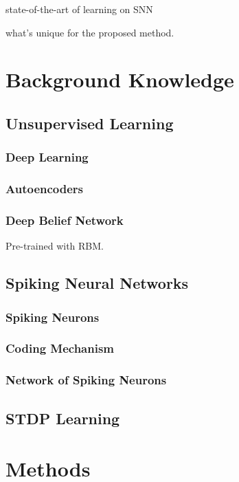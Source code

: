 \documentclass{article}
\begin{document}
state-of-the-art of learning on SNN\cite{ponulak2010supervised,neftci2013event,burbank2015mirrored}

what's unique for the proposed method.

\section{Background Knowledge}
\subsection{Unsupervised Learning}
\subsubsection{Deep Learning}
\subsubsection{Autoencoders}
\subsubsection{Deep Belief Network}
Pre-trained with RBM.
\subsection{Spiking Neural Networks}
\subsubsection{Spiking Neurons}
\subsubsection{Coding Mechanism}
\subsubsection{Network of Spiking Neurons}
\subsection{STDP Learning}

\section{Methods}
%
\end{document}
